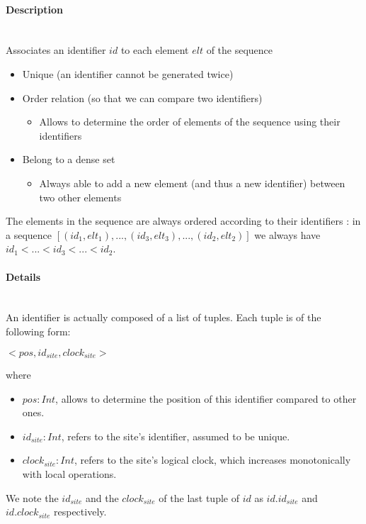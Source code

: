 \documentclass[a4paper]{article}
\begin{document}
\paragraph{Description} ~\\

Associates an identifier $id$ to each element $elt$ of the sequence
\begin{itemize}
  \item Unique (an identifier cannot be generated twice)
  \item Order relation (so that we can compare two identifiers)
  \begin{itemize}
    \item Allows to determine the order of elements of the sequence using their identifiers
  \end{itemize}
  \item Belong to a dense set
  \begin{itemize}
    \item Always able to add a new element (and thus a new identifier) between two other elements
  \end{itemize}
\end{itemize}

The elements in the sequence are always ordered according to their identifiers :
in a sequence $[(id_1, elt_1), ..., (id_3, elt_3), ..., (id_2, elt_2)]$
we always have $id_1 < ... < id_3 < ... < id_2$.

\paragraph{Details} ~\\

An identifier is actually composed of a list of tuples. Each tuple is of the following form:
\begin{center}
$<pos, id_{site}, clock_{site}>$
\end{center}
where
\begin{itemize}
  \item $pos: Int$, allows to determine the position of this identifier compared to other ones.
  \item $id_{site}: Int$, refers to the site's identifier, assumed to be unique.
  \item $clock_{site}: Int$, refers to the site's logical clock, which increases monotonically with local operations.
\end{itemize}

We note the $id_{site}$ and the $clock_{site}$ of the last tuple of $id$
as $id.id_{site}$ and $id.clock_{site}$ respectively.
\end{document}
